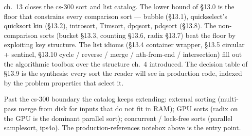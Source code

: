 \documentclass[11pt]{article}
\begin{document}
\begin{ideabox}
ch.~13 closes the cs-300 sort and list catalog. The lower bound
of \S13.0 is the floor that constrains every comparison sort ---
bubble (\S13.1), quickselect's quicksort kin (\S13.2),
introsort, Timsort, dpqsort, pdqsort (\S13.8). The non-comparison
sorts (bucket \S13.3, counting \S13.6, radix \S13.7) beat the
floor by exploiting key structure. The list idioms (\S13.4
container wrapper, \S13.5 circular + sentinel,
\S13.10 cycle / reverse / merge / nth-from-end / intersection)
fill out the algorithmic toolbox over the structure ch.~4
introduced. The decision table of \S13.9 is the synthesis: every
sort the reader will see in production code, indexed by the
problem properties that select it.

Past the cs-300 boundary the catalog keeps extending: external
sorting (multi-pass merge from disk for inputs that do not fit
in RAM); GPU sorts (radix on the GPU is the dominant parallel
sort); concurrent / lock-free sorts (parallel samplesort,
ips4o). The production-references notebox above is the entry
point.
\end{ideabox}
\end{document}
